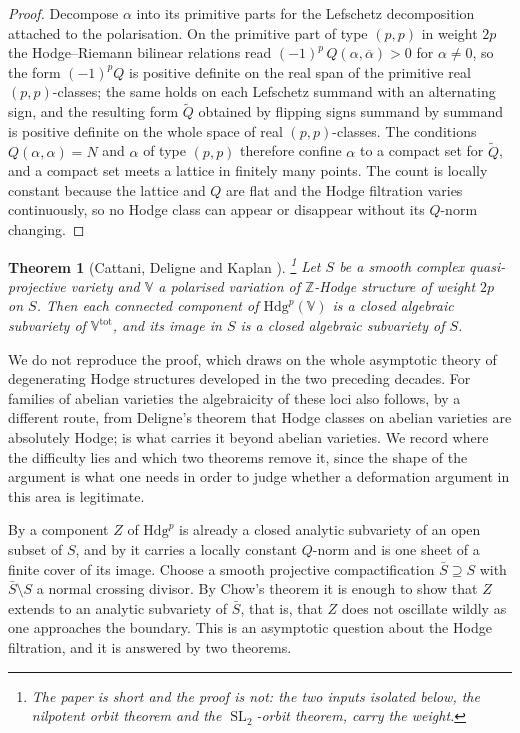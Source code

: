 \documentclass[11pt,reqno]{amsart}
\theoremstyle{plain}
\newtheorem{theorem}{Theorem}[section]
\theoremstyle{definition}
\theoremstyle{remark}
\newcommand{\ZZ}{\mathbb{Z}}
\newcommand{\Hdg}{\mathrm{Hdg}}
\DeclareMathOperator{\SL}{SL}
\newcommand{\bbar}[1]{\overline{#1}}
\begin{document}
\begin{proof}
Decompose $\alpha$ into its primitive parts for the Lefschetz decomposition
attached to the polarisation. On the primitive part of type $(p,p)$ in weight
$2p$ the Hodge--Riemann bilinear relations read
$(-1)^{p}\,Q(\alpha,\bbar{\alpha})>0$ for $\alpha\ne0$, so the form
$(-1)^{p}Q$ is positive definite on the real span of the primitive real
$(p,p)$-classes; the same holds on each Lefschetz summand with an alternating
sign, and the resulting form $\tilde Q$ obtained by flipping signs summand by
summand is positive definite on the whole space of real $(p,p)$-classes. The
conditions $Q(\alpha,\alpha)=N$ and $\alpha$ of type $(p,p)$ therefore confine
$\alpha$ to a compact set for $\tilde Q$, and a compact set meets a lattice in
finitely many points. The count is locally constant because the lattice and $Q$
are flat and the Hodge filtration varies continuously, so no Hodge class can
appear or disappear without its $Q$-norm changing.
\end{proof}

\begin{theorem}[Cattani, Deligne and Kaplan \cite{CDK95}]\label{thm:cdk}%
\footnote{The paper is short and the proof is not: the two inputs isolated
below, the nilpotent orbit theorem and the $\SL_{2}$-orbit theorem, carry the
weight.}
Let $S$ be a smooth complex quasi-projective variety and $\mathbb{V}$ a
polarised variation of $\ZZ$-Hodge structure of weight $2p$ on $S$. Then each
connected component of $\Hdg^{p}(\mathbb{V})$ is a closed algebraic subvariety
of $\mathbb{V}^{\mathrm{tot}}$, and its image in $S$ is a closed algebraic
subvariety of $S$.
\end{theorem}

We do not reproduce the proof, which draws on the whole asymptotic theory of
degenerating Hodge structures developed in the two preceding decades. For
families of abelian varieties the algebraicity of these loci also follows, by
a different route, from Deligne's theorem that Hodge classes on abelian
varieties are absolutely Hodge;  is what carries it beyond
abelian varieties. We record where the difficulty lies and which two
theorems remove it, since the shape of the argument is what one needs in
order to judge whether a deformation argument in this area is legitimate.

By  a component $Z$ of $\Hdg^{p}$ is already a closed
analytic subvariety of an open subset of $S$, and by  it
carries a locally constant $Q$-norm and is one sheet of a finite cover of its
image. Choose a smooth projective compactification $\bar S\supseteq S$ with
$\bar S\setminus S$ a normal crossing divisor. By Chow's theorem it is enough
to show that $Z$ extends to an analytic subvariety of $\bar S$, that is, that
$Z$ does not oscillate wildly as one approaches the boundary. This is an
asymptotic question about the Hodge filtration, and it is answered by two
theorems.
\end{document}
